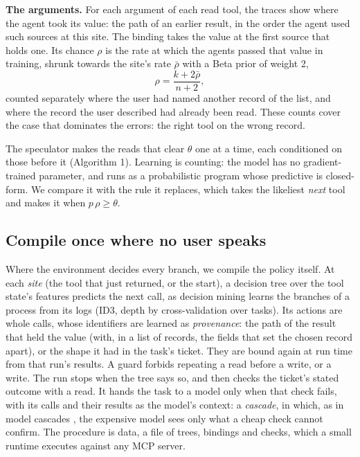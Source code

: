 \documentclass[10pt,twocolumn,letterpaper]{article}
\newcommand{\runin}[1]{{\sffamily\bfseries\color{accent}#1}}
\begin{document}
\runin{The arguments.} For each argument of each read tool, the traces show where the agent took its value: the path of an earlier result, in the order the agent used such sources at this site. The binding takes the value at the first source that holds one. Its chance \(\rho\) is the rate at which the agents passed that value in training, shrunk towards the site's rate \(\bar\rho\) with a Beta prior of weight 2, \[\rho = \frac{k + 2\bar\rho}{n + 2},\] counted separately where the user had named another record of the list, and where the record the user described had already been read. These counts cover the case that dominates the errors: the right tool on the wrong record.

The speculator makes the reads that clear \(\theta\) one at a time, each conditioned on those before it (Algorithm 1). Learning is counting: the model has no gradient-trained parameter, and runs as a probabilistic program \citep{nodeland2026fugue} whose predictive is closed-form. We compare it with the rule it replaces, which takes the likeliest \emph{next} tool and makes it when \(p\,\rho \ge \theta\).



\subsection{Compile once where no user speaks}\label{compile-once-where-no-user-speaks}

Where the environment decides every branch, we compile the policy itself. At each \emph{site} (the tool that just returned, or the start), a decision tree over the tool state's features predicts the next call, as decision mining learns the branches of a process from its logs \citep{rozinat2006decision} (ID3, depth by cross-validation over tasks). Its actions are whole calls, whose identifiers are learned as \emph{provenance}: the path of the result that held the value (with, in a list of records, the fields that set the chosen record apart), or the shape it had in the task's ticket. They are bound again at run time from that run's results. A guard forbids repeating a read before a write, or a write. The run stops when the tree says so, and then checks the ticket's stated outcome with a read. It hands the task to a model only when that check fails, with its calls and their results as the model's context: a \emph{cascade}, in which, as in model cascades \citep{chen2023frugalgpt, madaan2024automix}, the expensive model sees only what a cheap check cannot confirm. The procedure is data, a file of trees, bindings and checks, which a small runtime executes against any MCP server.
\end{document}
